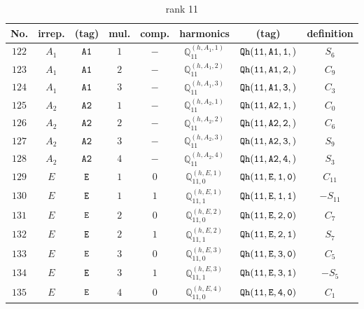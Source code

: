\documentclass[fleqn,8pt]{jsarticle}
\begin{document}
\begin{table}[ht!]
\begin{center}
\caption{rank 11}
\renewcommand{\arraystretch}{1.3}
\begin{tabular}{cccccccc} \hline \hline
No. & irrep. & (tag) & mul. & comp. & harmonics & (tag) & definition \\ \hline
$ 122 $ & $ A_{1} $ & $ {\tt A1} $ & $ 1 $ & $ - $ & $ \mathbb{Q}_{11}^{(h,A_{1},1)} $ & $ {\tt Qh(11,A1,1,)} $ & $ S_{6} $ \\
$ 123 $ & $ A_{1} $ & $ {\tt A1} $ & $ 2 $ & $ - $ & $ \mathbb{Q}_{11}^{(h,A_{1},2)} $ & $ {\tt Qh(11,A1,2,)} $ & $ C_{9} $ \\
$ 124 $ & $ A_{1} $ & $ {\tt A1} $ & $ 3 $ & $ - $ & $ \mathbb{Q}_{11}^{(h,A_{1},3)} $ & $ {\tt Qh(11,A1,3,)} $ & $ C_{3} $ \\
$ 125 $ & $ A_{2} $ & $ {\tt A2} $ & $ 1 $ & $ - $ & $ \mathbb{Q}_{11}^{(h,A_{2},1)} $ & $ {\tt Qh(11,A2,1,)} $ & $ C_{0} $ \\
$ 126 $ & $ A_{2} $ & $ {\tt A2} $ & $ 2 $ & $ - $ & $ \mathbb{Q}_{11}^{(h,A_{2},2)} $ & $ {\tt Qh(11,A2,2,)} $ & $ C_{6} $ \\
$ 127 $ & $ A_{2} $ & $ {\tt A2} $ & $ 3 $ & $ - $ & $ \mathbb{Q}_{11}^{(h,A_{2},3)} $ & $ {\tt Qh(11,A2,3,)} $ & $ S_{9} $ \\
$ 128 $ & $ A_{2} $ & $ {\tt A2} $ & $ 4 $ & $ - $ & $ \mathbb{Q}_{11}^{(h,A_{2},4)} $ & $ {\tt Qh(11,A2,4,)} $ & $ S_{3} $ \\
$ 129 $ & $ E $ & $ {\tt E} $ & $ 1 $ & $ 0 $ & $ \mathbb{Q}_{11,0}^{(h,E,1)} $ & $ {\tt Qh(11,E,1,0)} $ & $ C_{11} $ \\
$ 130 $ & $ E $ & $ {\tt E} $ & $ 1 $ & $ 1 $ & $ \mathbb{Q}_{11,1}^{(h,E,1)} $ & $ {\tt Qh(11,E,1,1)} $ & $ - S_{11} $ \\
$ 131 $ & $ E $ & $ {\tt E} $ & $ 2 $ & $ 0 $ & $ \mathbb{Q}_{11,0}^{(h,E,2)} $ & $ {\tt Qh(11,E,2,0)} $ & $ C_{7} $ \\
$ 132 $ & $ E $ & $ {\tt E} $ & $ 2 $ & $ 1 $ & $ \mathbb{Q}_{11,1}^{(h,E,2)} $ & $ {\tt Qh(11,E,2,1)} $ & $ S_{7} $ \\
$ 133 $ & $ E $ & $ {\tt E} $ & $ 3 $ & $ 0 $ & $ \mathbb{Q}_{11,0}^{(h,E,3)} $ & $ {\tt Qh(11,E,3,0)} $ & $ C_{5} $ \\
$ 134 $ & $ E $ & $ {\tt E} $ & $ 3 $ & $ 1 $ & $ \mathbb{Q}_{11,1}^{(h,E,3)} $ & $ {\tt Qh(11,E,3,1)} $ & $ - S_{5} $ \\
$ 135 $ & $ E $ & $ {\tt E} $ & $ 4 $ & $ 0 $ & $ \mathbb{Q}_{11,0}^{(h,E,4)} $ & $ {\tt Qh(11,E,4,0)} $ & $ C_{1} $ \\

\end{tabular}
\end{center}
\end{table}
\end{document}
